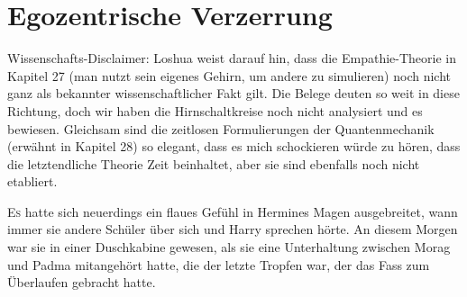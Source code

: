 \chapter{Egozentrische Verzerrung}

\begin{chapterOpeningAuthorNote}
%
Wissenschafts-Disclaimer: Loshua weist darauf hin, dass die Empathie-Theorie in Kapitel 27 (man nutzt sein eigenes Gehirn, um andere zu simulieren) noch nicht ganz als bekannter wissenschaftlicher Fakt gilt. Die Belege deuten so weit in diese Richtung, doch wir haben die Hirnschaltkreise noch nicht analysiert und es bewiesen. Gleichsam sind die zeitlosen Formulierungen der Quantenmechanik (erwähnt in Kapitel 28) so elegant, dass es mich schockieren würde zu hören, dass die letztendliche Theorie Zeit beinhaltet, aber sie sind ebenfalls noch nicht etabliert.
\end{chapterOpeningAuthorNote}

\lettrine{E}{s} hatte sich neuerdings ein flaues Gefühl in Hermines Magen ausgebreitet, wann immer sie andere Schüler über sich und Harry sprechen hörte. An diesem Morgen war sie in einer Duschkabine gewesen, als sie eine Unterhaltung zwischen Morag und Padma mitangehört hatte, die der letzte Tropfen war, der das Fass zum Überlaufen gebracht hatte.

